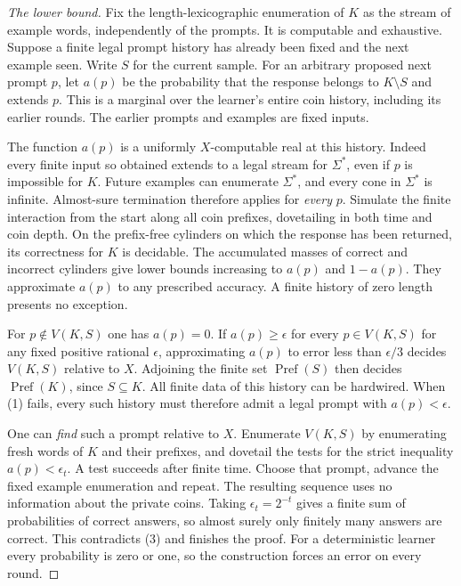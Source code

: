\documentclass[11pt]{article}
\newcommand{\Pref}{\operatorname{Pref}}
\newcommand{\Full}{\Sigma^*}
\begin{document}
\begin{proof}[The lower bound]
Fix the length-lexicographic enumeration of $K$ as the stream of example words, independently of the prompts. It is computable and exhaustive. Suppose a finite legal prompt history has already been fixed and the next example seen. Write $S$ for the current sample. For an arbitrary proposed next prompt $p$, let $a(p)$ be the probability that the response belongs to $K\setminus S$ and extends $p$. This is a marginal over the learner's entire coin history, including its earlier rounds. The earlier prompts and examples are fixed inputs.

The function $a(p)$ is a uniformly $X$-computable real at this history. Indeed every finite input so obtained extends to a legal stream for $\Full$, even if $p$ is impossible for $K$. Future examples can enumerate $\Full$, and every cone in $\Full$ is infinite. Almost-sure termination therefore applies for \emph{every} $p$. Simulate the finite interaction from the start along all coin prefixes, dovetailing in both time and coin depth. On the prefix-free cylinders on which the response has been returned, its correctness for $K$ is decidable. The accumulated masses of correct and incorrect cylinders give lower bounds increasing to $a(p)$ and $1-a(p)$. They approximate $a(p)$ to any prescribed accuracy. A finite history of zero length presents no exception.

For $p\notin V(K,S)$ one has $a(p)=0$. If $a(p)\ge\epsilon$ for every $p\in V(K,S)$ for any fixed positive rational $\epsilon$, approximating $a(p)$ to error less than $\epsilon/3$ decides $V(K,S)$ relative to $X$. Adjoining the finite set $\Pref(S)$ then decides $\Pref(K)$, since $S\subseteq K$. All finite data of this history can be hardwired. When (1) fails, every such history must therefore admit a legal prompt with $a(p)<\epsilon$.

One can \emph{find} such a prompt relative to $X$. Enumerate $V(K,S)$ by enumerating fresh words of $K$ and their prefixes, and dovetail the tests for the strict inequality $a(p)<\epsilon_t$. A test succeeds after finite time. Choose that prompt, advance the fixed example enumeration and repeat. The resulting sequence uses no information about the private coins. Taking $\epsilon_t=2^{-t}$ gives a finite sum of probabilities of correct answers, so almost surely only finitely many answers are correct. This contradicts (3) and finishes the proof. For a deterministic learner every probability is zero or one, so the construction forces an error on every round.
\end{proof}
\end{document}
